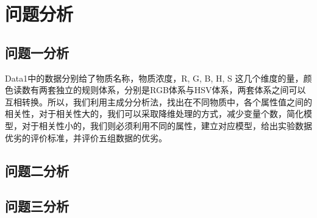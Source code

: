 \section{问题分析}
\subsection{问题一分析}
Data1中的数据分别给了物质名称，物质浓度，R, G, B, H, S 这几个维度的量，颜色读数有两套独立的规则体系，分别是RGB体系与HSV体系，两套体系之间可以互相转换。所以，我们利用主成分分析法，找出在不同物质中，各个属性值之间的相关性，对于相关性大的，我们可以采取降维处理的方式，减少变量个数，简化模型，对于相关性小的，我们则必须利用不同的属性，建立对应模型，给出实验数据优劣的评价标准，并评价五组数据的优劣。

\subsection{问题二分析}

\subsection{问题三分析}
